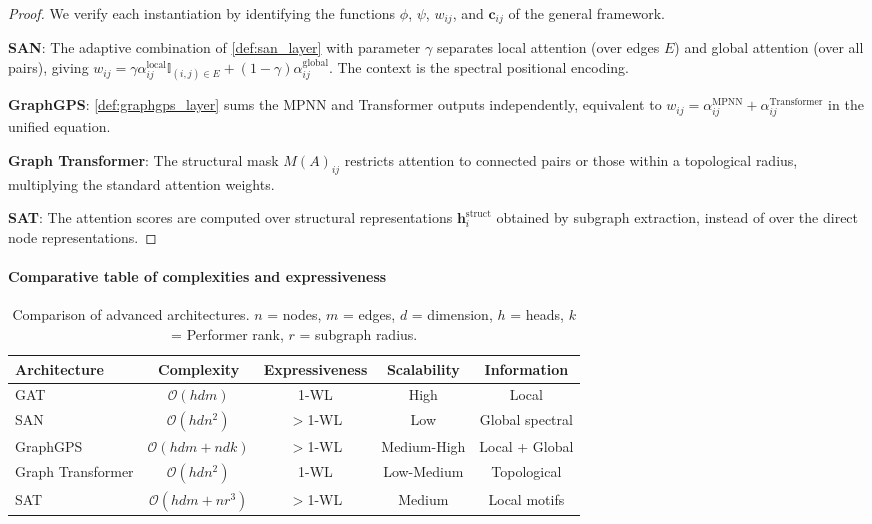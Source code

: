 \begin{proof}
We verify each instantiation by identifying the functions $\phi$, $\psi$, $w_{ij}$, and $\mathbf{c}_{ij}$ of the general framework.

\textbf{SAN}: The adaptive combination of \autoref{def:san_layer} with parameter $\gamma$ separates local attention (over edges $E$) and global attention (over all pairs), giving $w_{ij} = \gamma \alpha_{ij}^{\text{local}} \mathbb{I}_{(i,j) \in E} + (1-\gamma) \alpha_{ij}^{\text{global}}$. The context is the spectral positional encoding.

\textbf{GraphGPS}: \autoref{def:graphgps_layer} sums the MPNN and Transformer outputs independently, equivalent to $w_{ij} = \alpha_{ij}^{\text{MPNN}} + \alpha_{ij}^{\text{Transformer}}$ in the unified equation.

\textbf{Graph Transformer}: The structural mask $M(A)_{ij}$ restricts attention to connected pairs or those within a topological radius, multiplying the standard attention weights.

\textbf{SAT}: The attention scores are computed over structural representations $\mathbf{h}_i^{\text{struct}}$ obtained by subgraph extraction, instead of over the direct node representations.
\end{proof}

\paragraph{Comparative table of complexities and expressiveness}

\begin{table}[h]
\centering
\small
\begin{tabular}{|l|c|c|c|c|}
\hline
\textbf{Architecture} & \textbf{Complexity} & \textbf{Expressiveness} & \textbf{Scalability} & \textbf{Information} \\
\hline
GAT & $\mathcal{O}(hdm)$ & 1-WL & High & Local \\
SAN & $\mathcal{O}(hdn^2)$ & $>$1-WL & Low & Global spectral \\
GraphGPS & $\mathcal{O}(hdm + ndk)$ & $>$1-WL & Medium-High & Local + Global \\
Graph Transformer & $\mathcal{O}(hdn^2)$ & 1-WL & Low-Medium & Topological \\
SAT & $\mathcal{O}(hdm + nr^3)$ & $>$1-WL & Medium & Local motifs \\
\hline
\end{tabular}
\caption[Comparison of advanced architectures]{Comparison of advanced architectures. $n$ = nodes, $m$ = edges, $d$ = dimension, $h$ = heads, $k$ = Performer rank, $r$ = subgraph radius.}
\label{tab:advanced_architectures_comparison}
\end{table}

